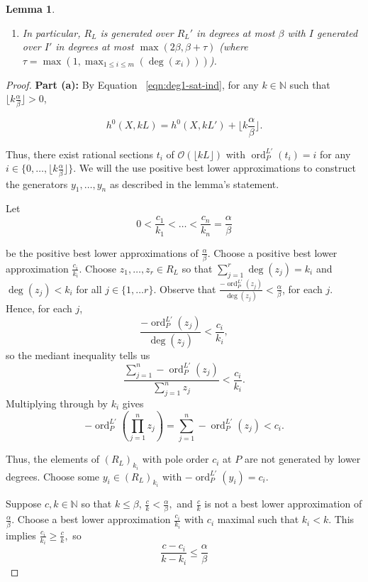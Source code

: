 \documentclass{amsart}
\theoremstyle{plain}
\newtheorem{lem}[thm]{Lemma}
\theoremstyle{definition}
\theoremstyle{remark}
\numberwithin{equation}{section}
\newcommand\BN{{\mathbb N}}
\newcommand\sco{{\mathscr O}}
\DeclareMathOperator{\ord}{ord}
\newcommand{\halfcan}{L}
\begin{document}
\begin{lem}
\begin{enumerate}
\item[(c)] In particular, $R_\halfcan$ is generated over $R_\halfcan'$
	in degrees at most $\beta$ with $I$ generated over $I'$ in
	degrees at most $\max(2 \beta, \beta + \tau)$ (where $\tau = \max(1,
	\max_{1 \leq i \leq m}(\deg(x_i)))$).
\end{enumerate}
\end{lem}

\begin{proof}
{\bf Part (a):}
By
Equation ~\ref{eqn:deg1-sat-ind}, for any $k
\in \BN$ such that $\lfloor k \frac{ \alpha}{\beta} \rfloor > 0$,

\[
	h^0 (X, k \halfcan ) = h^0(X, k \halfcan') + \lfloor k \frac{\alpha}{\beta}\rfloor.
\]

\noindent
Thus, there exist rational sections $t_i$ of $\sco(\lfloor k \halfcan \rfloor)$ with $\ord_P^{L'}(t_i) = i$
for any $i \in \{0, \ldots, \lfloor k \frac{\alpha}{
\beta} \rfloor \}$. We will the use positive best lower approximations to
construct the generators $y_1, \ldots, y_n$ as described in the lemma's statement.

Let 
\[
	0 < \frac{c_1}{k_1} < \ldots < \frac{c_n}{k_n} = \frac{\alpha}{
	\beta}
\]

\noindent
be the positive best lower approximations of $\frac{
\alpha}{\beta}$. 
Choose a positive best lower approximation $\frac{c_i}{k_i}$.  Choose $z_1, \ldots, z_r \in R_\halfcan$ so that $\sum_{j=1}^r \deg(z_j) = k_i$ and $\deg(z_j)<k_i$ for all $j\in \{1, \ldots r\}$. Observe that $\frac{-\ord_P^{\halfcan'}(z_j)}{\deg(z_j)}< \frac{\alpha}{\beta}$, for each $j$.  Hence, for each $j$, 
\[
	\frac{-\ord_P^{\halfcan'}(z_j)}{\deg(z_j)} < \frac{c_i}{k_i},
\]
so the mediant inequality tells us
\[
	\frac{\sum_{j=1}^n -\ord^{\halfcan'}_P(z_j)}{\sum_{j=1}^n z_j } < \frac{c_i}{k_i}.
\]
Multiplying through by $k_i$ gives
\[
	-\ord^{\halfcan'}_P \left(\prod_{j=1}^n z_j \right) = \sum_{j=1}^n -\ord^{\halfcan'}_P(z_j) < c_i .
\]

\noindent
Thus, the elements of $(R_{\halfcan})_{k_i}$ with pole order $c_i$ at $P$ are not generated by 
lower degrees. 
Choose some $y_i \in(R_{
\halfcan})_{k_i}$ with $-\ord_{P}^{L'}(y_i)=c_i$.

Suppose $c,k \in \BN$ so that $k \le \beta$,  $\frac{c}{k} < \frac{\alpha}{
\beta},$ and $\frac{c}{k}$ is not a best lower approximation of $\frac{\alpha}{\beta}$. Choose a
best lower approximation $\frac{c_i}{k_i}$ with $c_i$ maximal such that $k_i< k$.  This implies $\frac{c_i}{k_i}\ge \frac{c}{k},$ so
\[
	\frac{c-c_i}{k-k_i}\le \frac{\alpha}{\beta}
\]


\end{proof}
\end{document}

